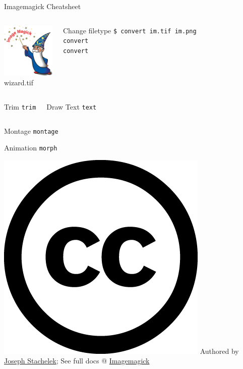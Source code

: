 \documentclass[hyperref={colorlinks,citecolor=pink,linkcolor=red,urlcolor=blue}]{beamer}
\begin{document}
\begin{frame}{Imagemagick Cheatsheet}

\begin{minipage}[0.2\textheight]{\textwidth}
	\begin{columns}[T]
			\includegraphics[width=1in]{Imagemagick-logo.png}\\
			\small{wizard.tif}
			\begin{exampleblock}{Change filetype}
				\texttt{\$ convert im.tif im.png}\\
				\texttt{convert}\\
				\texttt{convert}
			\end{exampleblock}	
	\end{columns}
\end{minipage}

\begin{columns}[t]
			\begin{exampleblock}{Trim}
				\texttt{trim}
			\end{exampleblock}
		\begin{exampleblock}{Draw Text}
			\texttt{text}
		\end{exampleblock}
\end{columns}

\begin{exampleblock}{Montage}
	\texttt{montage}
\end{exampleblock}

\begin{exampleblock}{Animation}
	\texttt{morph}
\end{exampleblock}

\includegraphics[width=.3in]{cc.large.png} Authored by \href{http://jsta.github.io}{Joseph Stachelek}; See full docs @
\href{http://www.imagemagick.org}{Imagemagick}
\end{frame}
\end{document}
